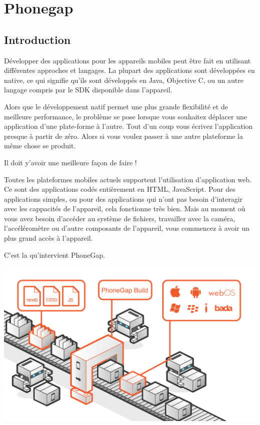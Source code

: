 \chapter{Phonegap}
\label{ch:phonegap}

\section*{Introduction}

Développer des applications pour les appareils mobiles peut être fait en utilisant différentes approches et langages. La plupart des applications sont développées en native, ce qui signifie qu’ils sont développés en Java, Objective C, ou un autre langage compris par le SDK disponible dans l’appareil.

Alors que le développement natif permet une plus grande flexibilité et de meilleure performance, le problème se pose lorsque vous souhaitez déplacer une application d’une plate-forme à l’autre. Tout d’un coup vous écrivez l’application presque à partir de zéro. Alors si vous voulez passer à une autre plateforme la même chose se produit.

Il doit y’avoir une meilleure façon de faire !

Toutes les plateformes mobiles actuels supportent l’utilisation d’application web. Ce sont des applications codés entièrement en HTML, JavaScript. Pour des applications simples, ou pour des applications qui n’ont pas besoin d’interagir avec les cappacités de l’appareil, cela fonctionne très bien. Mais au moment où vous avez besoin d’accéder au système de fichiers, travailler avec la caméra, l’accéléromètre ou d’autre composants de l’appareil, vous commencez à avoir un plus grand accès à l’appareil.

C’est la qu’intervient PhoneGap.


\begin{center}
\includegraphics[width=14cm]{img/phonegap.png}
\label{Plateforme Wakanda}
\end{center}


